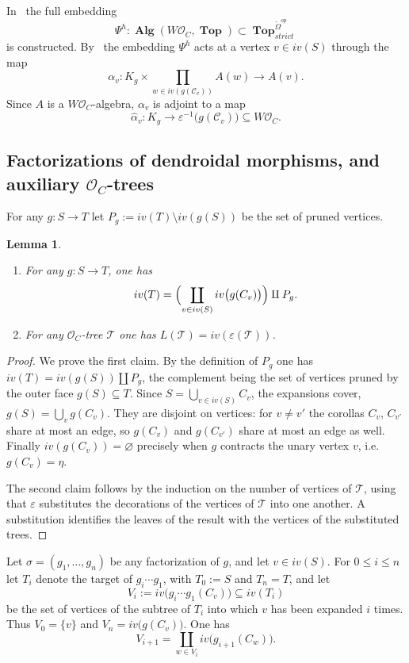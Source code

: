 \documentclass{amsart}
\newtheorem{lemma}[formula]{Lemma}
\theoremstyle{definition}
\theoremstyle{remark}
\newcommand{\eps}{\varepsilon}
\DeclareMathOperator{\Top}{\mathbf{Top}}
\DeclareMathOperator{\Alg}{\mathbf{Alg}}
\begin{document}
	In~\cite[Thm.~B.6]{clrrw-22} the full embedding
	\[
		\Psi^{h}\colon\Alg(W\mathcal{O}_C,\Top)\subset\Top^{\widetilde\Omega^{op}}_{strict}
	\]
	is constructed. 
	By~\cite[(B.1)]{clrrw-22} the embedding $\Psi^h$ acts at a vertex $v\in iv(S)$ through
	the map 
	\[
		\alpha_v\colon K_g\times\prod_{w\in iv(g(\mathcal{C}_v))}A(w)\to A(v).
	\]
	Since $A$ is a $W\mathcal{O}_C$-algebra, $\alpha_v$ is adjoint to a map
	\[
		\widehat{\alpha}_v\colon K_g\rightarrow
		\eps^{-1}\bigl(g(\mathcal{C}_v)\bigr)\subseteq W\mathcal{O}_C .
	\]

	\subsection{Factorizations of dendroidal morphisms, and auxiliary $\mathcal{O}_{C}$-trees}\label{ssec:facaux}
	For any $g\colon S\to T$ let
	$P_g:=iv(T)\setminus iv(g(S))$ be the set of pruned vertices.

	\begin{lemma}\label{lem:bookkeeping}
		\begin{enumerate}[label=(\roman*)]
			\item For any $g\colon S\to T$, one has 
			\[
			iv(T)=\Bigl(\coprod_{v\in iv(S)} iv\bigl(g(C_v)\bigr)\Bigr)\amalg P_{g}.
			\]
			\item For any $\mathcal{O}_C$-tree $\mathcal{T}$ one has $L(\mathcal{T})=iv(\eps(\mathcal{T}))$.
		\end{enumerate}
	\end{lemma}
	\begin{proof}
		We prove the first claim. 
		By the definition of $P_g$ one has $iv(T)=iv(g(S))\amalg P_g$, the
		complement being the set of vertices pruned by the outer face $g(S)\subseteq T$. Since
		$S=\bigcup_{v\in iv(S)}C_v$, the expansions cover,
		$g(S)=\bigcup_{v}g(C_v)$. 
		They are disjoint on vertices: for $v\neq v'$ the corollas $C_v$, $C_{v'}$ share at most an edge, so $g(C_v)$ and $g(C_{v'})$ share at most an edge as well. 
		Finally $iv(g(C_v))=\varnothing$ precisely when $g$ contracts the unary vertex
		$v$, i.e. $g(C_v)=\eta$.
		
		The second claim follows by the induction on the number of vertices of $\mathcal{T}$, using that $\eps$
		substitutes the decorations of the vertices of $\mathcal{T}$ into one another.
		A substitution identifies the leaves of the result with the vertices of the substituted trees.
	\end{proof}

	Let $\sigma=(g_1,\dots,g_n)$ be any factorization of $g$, and let $v\in iv(S)$.
	For $0\leqslant i\leqslant n$ let $T_i$ denote the target of $g_i\cdots g_1$,
	with $T_0:=S$ and $T_n=T$, and let
	\[
		V_i:= iv\bigl(g_i\cdots g_1(C_v)\bigr)\subseteq iv(T_i)
	\]
	be the set of vertices of the subtree of $T_i$ into which $v$ has been
	expanded $i$ times.
	Thus $V_0=\{v\}$ and $V_n=iv\bigl(g(C_v)\bigr)$. 
	One has
	\[
		V_{i+1}=\coprod_{w\in V_i} iv\bigl(g_{i+1}(C_w)\bigr).
	\]
\end{document}
